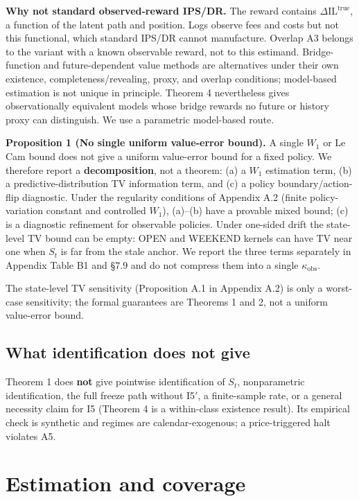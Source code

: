 \textbf{Why not standard observed-reward IPS/DR.} The reward contains $\Delta\mathrm{IL}^{\mathrm{true}}$, a function of the latent path and position. Logs observe fees and costs but not this functional, which standard IPS/DR cannot manufacture. Overlap A3 belongs to the variant with a known observable reward, not to this estimand. Bridge-function and future-dependent value methods are alternatives under their own existence, completeness/revealing, proxy, and overlap conditions; model-based estimation is not unique in principle. Theorem 4 nevertheless gives observationally equivalent models whose bridge rewards no future or history proxy can distinguish. We use a parametric model-based route.

\textbf{Proposition 1 (No single uniform value-error bound).} A single $W_1$ or Le Cam bound does not give a uniform value-error bound for a fixed policy. We therefore report a \textbf{decomposition}, not a theorem: (a) a $W_1$ estimation term, (b) a predictive-distribution TV information term, and (c) a policy boundary/action-flip diagnostic. Under the regularity conditions of Appendix A.2 (finite policy-variation constant and controlled $W_1$), (a)--(b) have a provable mixed bound; (c) is a diagnostic refinement for observable policies. Under one-sided drift the state-level TV bound can be empty: OPEN and WEEKEND kernels can have TV near one when $S_t$ is far from the stale anchor. We report the three terms separately in Appendix Table B1 and \S7.9 and do not compress them into a single $\kappa_{\mathrm{obs}}$.

The state-level TV sensitivity (Proposition A.1 in Appendix A.2) is only a worst-case sensitivity; the formal guarantees are Theorems 1 and 2, not a uniform value-error bound.

\subsection{What identification does not give}

Theorem 1 does \textbf{not} give pointwise identification of $S_t$, nonparametric identification, the full freeze path without I5$'$, a finite-sample rate, or a general necessity claim for I5 (Theorem 4 is a within-class existence result). Its empirical check is synthetic and regimes are calendar-exogenous; a price-triggered halt violates A5.

\section{Estimation and coverage}

